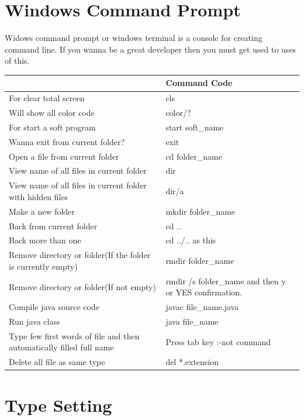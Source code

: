 \documentclass[11 pt]{book}
\begin{document}
\chapter{Windows Command Prompt}
Widows command prompt or windows terminal is a console for creating command line. If you wanna be a great developer then you must get used to uses of this.\\
\begin{center}
	\begin{tabularx}{0.9\textwidth}
	{|>{\raggedright\arraybackslash}X
	 |>{\raggedleft\arraybackslash}X	
	|}
		\hline
		{\color{red}Task}& {\color{red}Command Code}\\
		\hline
		\hline
		For clear total screen & cls\\
		\hline
		Will show all color code & color/?\\
		\hline
		For start a soft program & start soft\_name\\
		\hline
		Wanna exit from current folder? & exit\\
		\hline
		Open a file from current folder & cd folder\_name\\
		\hline
		View name of all files in current folder & dir\\
		\hline
		View name of all files in current folder with hidden files & dir/a\\
		\hline
		Make a new folder & mkdir folder\_name\\
		\hline
		Back from current folder & cd ..\\
		\hline
		Back more than one & cd ../.. as this\\
		\hline
		Remove directory or folder(If the folder is currently empty) & rmdir folder\_name\\
		\hline
		Remove directory or folder(If not empty) & rmdir /s folder\_name and then y or YES confirmation.\\
		\hline
		Compile java source code & javac file\_name.java\\
		\hline
		Run java class & java file\_name\\
		\hline
		Type few first words of file and then automatically filled full name & Press tab key :-not command\\
		\hline
		Delete all file as same type & del *.extension\\
		\hline
		
	\end{tabularx}
\end{center}

\chapter{Type Setting}
\end{document}
